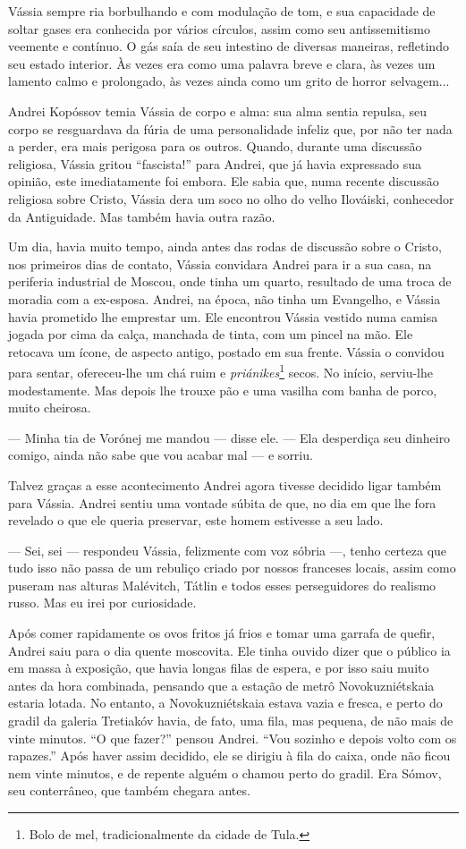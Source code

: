 Vássia sempre ria borbulhando e com modulação de tom, e sua capacidade
de soltar gases era conhecida por vários círculos, assim como seu
antissemitismo veemente e contínuo. O gás saía de seu intestino de
diversas maneiras, refletindo seu estado interior. Às vezes era como uma
palavra breve e clara, às vezes um lamento calmo e prolongado, às vezes
ainda como um grito de horror selvagem...

Andrei Kopóssov temia Vássia de corpo e alma: sua alma sentia repulsa,
seu corpo se resguardava da fúria de uma personalidade infeliz que, por
não ter nada a perder, era mais perigosa para os outros. Quando, durante
uma discussão religiosa, Vássia gritou ``fascista!'' para Andrei, que já
havia expressado sua opinião, este imediatamente foi embora. Ele sabia
que, numa recente discussão religiosa sobre Cristo, Vássia dera um soco
no olho do velho Ilováiski, conhecedor da Antiguidade. Mas também havia
outra razão.

Um dia, havia muito tempo, ainda antes das rodas de discussão sobre o
Cristo, nos primeiros dias de contato, Vássia convidara Andrei para ir a
sua casa, na periferia industrial de Moscou, onde tinha um quarto,
resultado de uma troca de moradia com a ex-esposa. Andrei, na época, não
tinha um Evangelho, e Vássia havia prometido lhe emprestar um. Ele
encontrou Vássia vestido numa camisa jogada por cima da calça, manchada
de tinta, com um pincel na mão. Ele retocava um ícone, de aspecto
antigo, postado em sua frente. Vássia o convidou para sentar,
ofereceu-lhe um chá ruim e \emph{priánikes}\footnote{Bolo de mel,
  tradicionalmente da cidade de Tula.} secos. No início, serviu-lhe
modestamente. Mas depois lhe trouxe pão e uma vasilha com banha de
porco, muito cheirosa.

--- Minha tia de Vorónej me mandou --- disse ele. --- Ela desperdiça seu
dinheiro comigo, ainda não sabe que vou acabar mal --- e sorriu.

Talvez graças a esse acontecimento Andrei agora tivesse decidido ligar
também para Vássia. Andrei sentiu uma vontade súbita de que, no dia em
que lhe fora revelado o que ele queria preservar, este homem estivesse a
seu lado.

--- Sei, sei --- respondeu Vássia, felizmente com voz sóbria ---, tenho
certeza que tudo isso não passa de um rebuliço criado por nossos
franceses locais, assim como puseram nas alturas Malévitch, Tátlin e
todos esses perseguidores do realismo russo. Mas eu irei por
curiosidade.

Após comer rapidamente os ovos fritos já frios e tomar uma garrafa de
quefir, Andrei saiu para o dia quente moscovita. Ele tinha ouvido dizer
que o público ia em massa à exposição, que havia longas filas de espera,
e por isso saiu muito antes da hora combinada, pensando que a estação de
metrô Novokuzniétskaia estaria lotada. No entanto, a Novokuzniétskaia
estava vazia e fresca, e perto do gradil da galeria Tretiakóv havia, de
fato, uma fila, mas pequena, de não mais de vinte minutos. ``O que
fazer?'' pensou Andrei. ``Vou sozinho e depois volto com os rapazes.''
Após haver assim decidido, ele se dirigiu à fila do caixa, onde não
ficou nem vinte minutos, e de repente alguém o chamou perto do gradil.
Era Sómov, seu conterrâneo, que também chegara antes.

